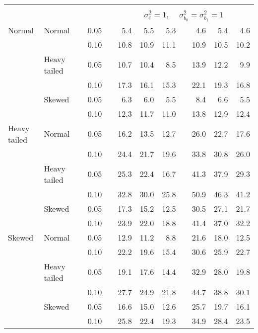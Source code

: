 \begin{table}[ht]
\begin{scriptsize}
\begin{center}
\begin{tabular}{ll p{.1cm} c p{.1cm} rrr p{.1cm} rrr}
&&&&&&&&&&&\\
& && && \multicolumn{7}{c}{$\sigma_{\varepsilon}^2 = 1$, \ \ $\sigma_{b_0}^2 = \sigma_{b_1}^2 = 1$} \\ \cline{6-12}
Normal       & Normal       && 0.05 &&   5.4 & 5.5 & 5.3 &   & 4.6 & 5.4 & 4.6 \\ 
             &              && 0.10 &&   10.8 & 10.9 & 11.1 &   & 10.9 & 10.5 & 10.2 \\ 
             & Heavy tailed && 0.05 &&   10.7 & 10.4 & 8.5 &   & 13.9 & 12.2 & 9.9 \\ 
             &              && 0.10 &&   17.3 & 16.1 & 15.3 &   & 22.1 & 19.3 & 16.8 \\ 
             & Skewed       && 0.05 &&   6.3 & 6.0 & 5.5 &   & 8.4 & 6.6 & 5.5 \\ 
             &              && 0.10 &&   12.3 & 11.7 & 11.0 &   & 13.8 & 12.9 & 12.4 \\ 
Heavy tailed & Normal       && 0.05 &&   16.2 & 13.5 & 12.7 &   & 26.0 & 22.7 & 17.6 \\ 
             &              && 0.10 &&   24.4 & 21.7 & 19.6 &   & 33.8 & 30.8 & 26.0 \\ 
             & Heavy tailed && 0.05 &&   25.3 & 22.4 & 16.7 &   & 41.3 & 37.9 & 29.3 \\ 
             &              && 0.10 &&   32.8 & 30.0 & 25.8 &   & 50.9 & 46.3 & 41.2 \\ 
             & Skewed       && 0.05 &&   17.3 & 15.2 & 12.5 &   & 30.5 & 27.1 & 21.7 \\ 
             &              && 0.10 &&   23.9 & 22.0 & 18.8 &   & 41.4 & 37.0 & 32.2 \\ 
Skewed       & Normal       && 0.05 &&   12.9 & 11.2 & 8.8 &   & 21.6 & 18.0 & 12.5 \\ 
             &              && 0.10 &&   22.2 & 19.6 & 15.4 &   & 30.6 & 25.9 & 22.7 \\ 
             & Heavy tailed && 0.05 &&   19.1 & 17.6 & 14.4 &   & 32.9 & 28.0 & 19.8 \\ 
             &              && 0.10 &&   27.7 & 24.9 & 21.8 &   & 44.7 & 38.8 & 30.1 \\ 
             & Skewed       && 0.05 &&   16.6 & 15.0 & 12.6 &   & 25.7 & 19.7 & 16.1 \\ 
             &              && 0.10 &&   25.8 & 22.4 & 19.3 &   & 34.9 & 28.4 & 23.5 \\ 


\end{tabular}
\end{center}
\end{scriptsize}
\end{table}
